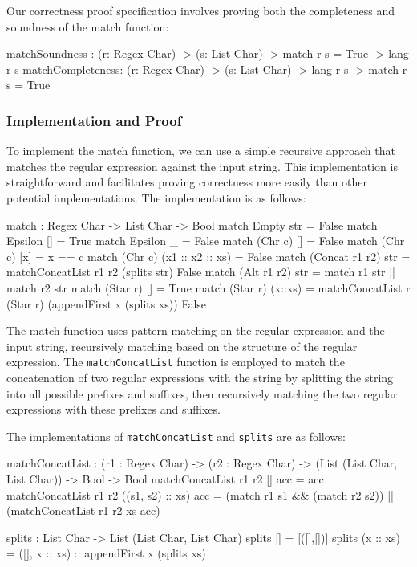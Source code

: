 \documentclass[]{rptuseminar}
\begin{document}
Our correctness proof specification involves proving both the completeness and soundness of the match function:

\begin{idris}
matchSoundness : (r: Regex Char) -> (s: List Char) -> match r s = True -> lang r s
matchCompleteness: (r: Regex Char) -> (s: List Char) -> lang r s -> match r s = True
\end{idris}

\subsubsection{Implementation and Proof}
\label{sec:implementation-and-proof}
To implement the match function, we can use a simple recursive approach that matches the regular expression against the input string. This implementation is straightforward and facilitates proving correctness more easily than other potential implementations. The implementation is as follows:

\begin{idris}
match : Regex Char -> List Char -> Bool
match Empty str = False
match Epsilon [] = True
match Epsilon _ = False
match (Chr c) [] = False
match (Chr c) [x] = x == c
match (Chr c) (x1 :: x2 :: xs) = False
match (Concat r1 r2) str =   
    matchConcatList r1 r2 (splits str) False
match (Alt r1 r2) str =   
    match r1 str || match r2 str  
match (Star r) [] = True
match (Star r) (x::xs) =
    matchConcatList r (Star r) (appendFirst x (splits xs)) False 
\end{idris}

The match function uses pattern matching on the regular expression and the input string, recursively matching based on the structure of the regular expression. The \texttt{matchConcatList} function is employed to match the concatenation of two regular expressions with the string by splitting the string into all possible prefixes and suffixes, then recursively matching the two regular expressions with these prefixes and suffixes.

The implementations of \texttt{matchConcatList} and \texttt{splits} are as follows:

\begin{idris}
matchConcatList : (r1 : Regex Char) -> (r2 : Regex Char) -> 
(List (List Char, List Char)) -> Bool -> Bool
matchConcatList r1 r2 [] acc = acc
matchConcatList r1 r2 ((s1, s2) :: xs) acc = 
    (match r1 s1 && (match r2 s2)) || (matchConcatList r1 r2 xs acc)

splits : List Char -> List (List Char, List Char)
splits [] = [([],[])]
splits (x :: xs) = ([], x :: xs) :: appendFirst x (splits xs)
\end{idris}
\end{document}
